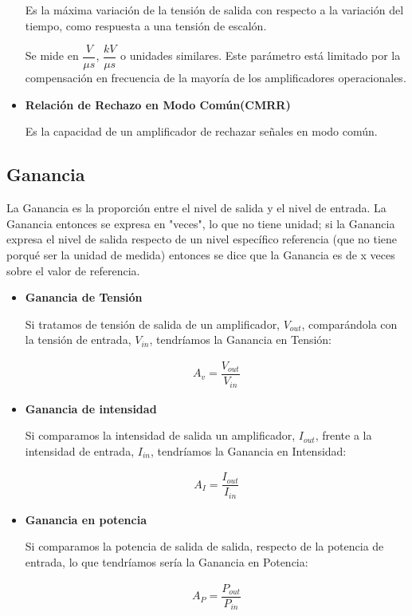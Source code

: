 \begin{itemize}
                Es la máxima variación de la tensión de salida con respecto a la variación del tiempo, como respuesta a una tensión de escalón. 
                
                Se mide en $\dfrac{V}{\mu s}$, $\dfrac{kV}{\mu s}$ o unidades similares. Este parámetro está limitado por la compensación en frecuencia de la mayoría de los amplificadores operacionales.

            \item \textbf{Relación de Rechazo en Modo Común(CMRR)}

                Es la capacidad de un amplificador de rechazar señales en modo común.            
        \end{itemize}

    \subsection{Ganancia}

        La Ganancia es la proporción entre el nivel de salida y el nivel de entrada. La Ganancia entonces se expresa en "veces", lo que no tiene unidad; si la Ganancia expresa el nivel de salida respecto de un nivel específico referencia (que no tiene porqué ser la unidad de medida) entonces se dice que la Ganancia es de x veces sobre el valor de referencia.

        \begin{itemize}
            \item \textbf{Ganancia de Tensión}

                Si tratamos de tensión de salida de un amplificador, $V_{out}$, comparándola con la tensión de entrada, $V_{in}$, tendríamos la Ganancia en Tensión:

                \begin{gather}
                    A_v=\dfrac{V_{out}}{V_{in}}
                \end{gather}

            \item \textbf{Ganancia de intensidad}

                Si comparamos la intensidad de salida un amplificador, $I_{out}$, frente a la intensidad de entrada, $I_{in}$, tendríamos la Ganancia en Intensidad:

                \begin{gather}
                    A_I=\dfrac{I_{out}}{I_{in}}
                \end{gather}

            \item \textbf{Ganancia en potencia}

                Si comparamos la potencia de salida de salida, respecto de la potencia de entrada, lo que tendríamos sería la Ganancia en Potencia:

                \begin{gather}
                    A_P=\dfrac{P_{out}}{P_{in}}
                \end{gather}
        \end{itemize}

